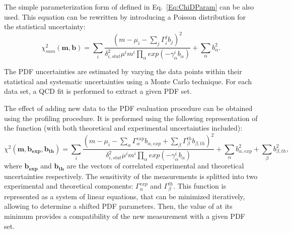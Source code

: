 The simple parameterization form of \chiD defined in Eq.~\ref{Eq:ChiDParam} can be also used. This equation can be rewritten by introducing a Poisson distribution for the statistical uncertainty:
\begin{equation}
\chi^{2}_{sum}(\mathbf{m},\mathbf{b})=\sum_{i} \frac{(m-\mu_i-\sum_j\Gamma_i^jb_j)^2}{\delta^{2}_{i,stat}\mu^{i}m^{i}\prod_{\alpha}exp(-\gamma_{\alpha}^ib_{\alpha})}+\sum_{\alpha} b_{\alpha}^2.
\end{equation}

The PDF uncertainties are estimated by varying the data points within their statistical and systematic uncertainties using a Monte Carlo technique. For each data set, a QCD fit is performed to extract a given PDF set. 

The effect of adding new data to the PDF evaluation procedure can be obtained using the profiling procedure\cite{PDFProf}. It is preformed using the following representation of the \chiD function (with both theoretical and experimental uncertainties included):
\begin{equation}
\chi^{2}(\mathbf{m},\mathbf{b_{exp}}, \mathbf{b_{th}})=\sum_{i} \frac{(m-\mu_i-\sum_\alpha \Gamma_\alpha^{exp}b_{\alpha, exp}+\sum_\beta \Gamma_\beta^{th}b_{\beta, th})^2}{\delta^{2}_{i,stat}\mu^{i}m^{i}\prod_{\alpha}exp(-\gamma_{\alpha}^ib_{\alpha})}+\sum_{\alpha} b_{\alpha, exp}^2 + \sum_{\beta} b_{\beta, th}^2,
\end{equation}
where $\mathbf{b_{exp}}$ and $\mathbf{b_{th}}$ are the vectors of correlated experimental and theoretical uncertainties respectively. The sensitivity of the measurements is splitted into two experimental and theoretical components: $\Gamma_\alpha^{exp}$ and $\Gamma_\beta^{th}$. This \chiD function is represented as a system of linear equations, that can be minimized iteratively, allowing to determine a shifted PDF parameters. Then, the value of \chiD at its minimum provides a compatibility of the new measurement with a given PDF set.
